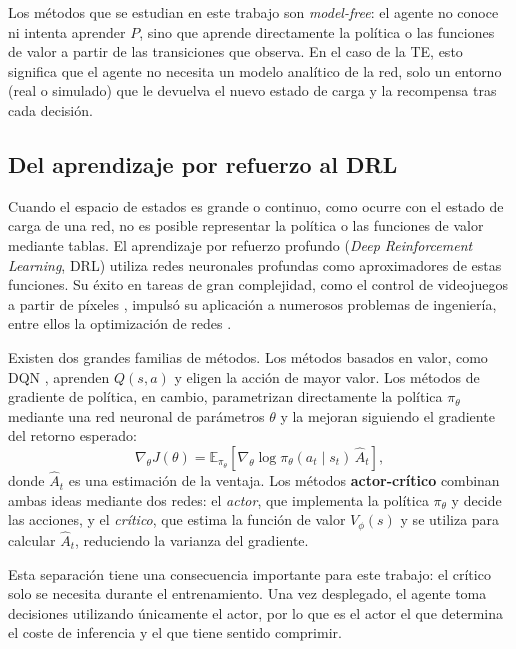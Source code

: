 Los métodos que se estudian en este trabajo son \textit{model-free}: el agente no conoce ni intenta aprender $P$, sino que aprende directamente la política o las funciones de valor a partir de las transiciones que observa. En el caso de la TE, esto significa que el agente no necesita un modelo analítico de la red, solo un entorno (real o simulado) que le devuelva el nuevo estado de carga y la recompensa tras cada decisión.

\subsection{Del aprendizaje por refuerzo al DRL}\label{sec:actor_critico}

Cuando el espacio de estados es grande o continuo, como ocurre con el estado de carga de una red, no es posible representar la política o las funciones de valor mediante tablas. El aprendizaje por refuerzo profundo (\textit{Deep Reinforcement Learning}, DRL) utiliza redes neuronales profundas como aproximadores de estas funciones. Su éxito en tareas de gran complejidad, como el control de videojuegos a partir de píxeles \cite{mnih2015human}, impulsó su aplicación a numerosos problemas de ingeniería, entre ellos la optimización de redes \cite{he2023routing,abo2024toward}.

Existen dos grandes familias de métodos. Los métodos basados en valor, como DQN \cite{mnih2015human}, aprenden $Q(s,a)$ y eligen la acción de mayor valor. Los métodos de gradiente de política, en cambio, parametrizan directamente la política $\pi_\theta$ mediante una red neuronal de parámetros $\theta$ y la mejoran siguiendo el gradiente del retorno esperado:
\begin{equation}\label{eq:policy_gradient}
	\nabla_\theta J(\theta) = \mathbb{E}_{\pi_\theta}\left[ \nabla_\theta \log \pi_\theta(a_t \mid s_t)\, \hat{A}_t \right],
\end{equation}
donde $\hat{A}_t$ es una estimación de la ventaja. Los métodos \textbf{actor-crítico} combinan ambas ideas mediante dos redes: el \textit{actor}, que implementa la política $\pi_\theta$ y decide las acciones, y el \textit{crítico}, que estima la función de valor $V_\phi(s)$ y se utiliza para calcular $\hat{A}_t$, reduciendo la varianza del gradiente.

Esta separación tiene una consecuencia importante para este trabajo: el crítico solo se necesita durante el entrenamiento. Una vez desplegado, el agente toma decisiones utilizando únicamente el actor, por lo que es el actor el que determina el coste de inferencia y el que tiene sentido comprimir.

